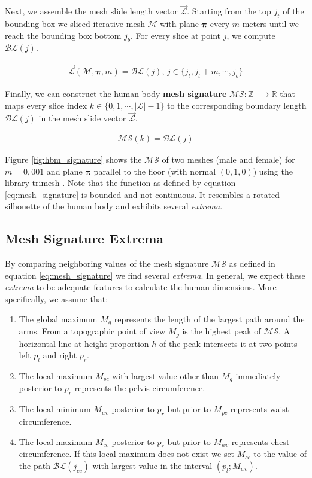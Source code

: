 \documentclass[10pt,twocolumn,letterpaper]{article}
\begin{document}
Next, we assemble the mesh slide length vector $\vec{\mathcal{L}}$. Starting 
from the 
top $j_t$ of the bounding box we sliced iterative mesh $\mathcal{M}$ with plane 
$\boldsymbol{\pi}$ every $m$-meters until we reach the bounding box bottom 
$j_b$. For every slice at point $j$, we compute $\mathcal{BL}(j)$.

\begin{align}
\vec{\mathcal{L}}(\mathcal{M}, \boldsymbol{\pi}, m) = \mathcal{BL}(j), \, j 
\in 
\{j_t, j_t+m, \cdots, j_b\}
\end{align}

Finally, we can construct the human body \textbf{mesh signature} $\mathcal{MS}: 
\mathbb{Z}^+ \to \mathbb{R}$ that maps every slice index $k \in \{0, 1, \cdots, 
|\mathcal{L}|-1\}$ to the corresponding boundary length $\mathcal{BL}(j)$ in 
the mesh slide vector $\vec{\mathcal{L}}$.

\begin{align}\label{eq:mesh_signature}
\mathcal{MS}(k) = \mathcal{BL}(j)
\end{align}

Figure \ref{fig:hbm_signature} shows the $\mathcal{MS}$ of two meshes (male 
and female) for 
$m=0,001$ and plane $\boldsymbol{\pi}$ parallel to the floor (with normal $(0, 
1,0)$) using the library trimesh \cite{trimesh}. Note that the function as 
defined by equation \ref{eq:mesh_signature} is bounded and not continuous. It 
resembles a rotated silhouette of the human body and exhibits several 
\textit{extrema}.

\subsection{Mesh Signature Extrema}\label{subsec:mesh_signature_extrema}

By comparing neighboring values of the mesh signature $\mathcal{MS}$ as defined 
in equation \ref{eq:mesh_signature} we find several \textit{extrema}. In 
general, we expect these \textit{extrema} to be adequate features to 
calculate the human dimensions. More specifically, we assume that:
\begin{enumerate}
	\item The global maximum $M_g$ represents the length of the largest path 
	around the arms. From a topographic point of view $M_g$ is the highest peak 
	of $\mathcal{MS}$. A horizontal line at height proportion $h$ of the peak 
	intersects 
	it at two points left $p_l$ and right $p_r$.
	\item The local maximum $M_{pc}$ with largest value other than $M_g$ 
	immediately posterior to $p_r$ represents the pelvis circumference.
	\item The local minimum $M_{wc}$ posterior to $p_r$ but prior to $M_{pc}$ 
	represents waist circumference.
	\item The local maximum $M_{cc}$ posterior to $p_r$ but prior to $M_{wc}$ 
	represents 
	chest circumference. If this local maximum does not exist we set $M_{cc}$ 
	to the value of the path $\mathcal{BL}(j_{cc})$ with largest value in the 
	interval $(p_l; M_{wc})$.
\end{enumerate}
\end{document}
